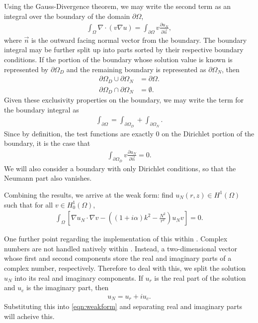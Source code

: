 Using the Gauss-Divergence theorem, we may write the second term as an integral over the boundary of the domain $\partial \Omega$,
\begin{align}
	\int_\Omega \nabla \cdot (v \nabla u ) = \int_{\partial\Omega} v \frac{\partial u_N}{\partial \vec{n}},
\end{align}
where $\vec{n}$ is the outward facing normal vector from the boundary.
The boundary integral may be further split up into parts sorted by their respective boundary conditions.
If the portion of the boundary whose solution value is known is represented by $\partial \Omega_D$ and the remaining boundary is represented as $\partial \Omega_N$, then
\begin{subequations}
\begin{align}
	\partial \Omega_D \cup \partial \Omega_N &= \partial \Omega. \\
	\partial \Omega_D \cap \partial \Omega_N &= \emptyset.
\end{align}
\end{subequations}
Given these exclusivity properties on the boundary, we may write the term for the boundary integral as
\begin{align}
	\int_{\partial\Omega} = \int_{\partial\Omega_D} + \int_{\partial\Omega_N}.
\end{align}
Since by definition, the test functions are exactly 0 on the Dirichlet portion of the boundary, it is the case that
\begin{align}
	\int_{\partial\Omega_D} v \frac{\partial u_N}{\partial \vec{n}} = 0.
\end{align}
We will also consider a boundary with only Dirichlet conditions, so that the Neumann part also vanishes.

Combining the results, we arrive at the weak form: find $u_N(r,z) \in H^1(\Omega)$ such that for all $v \in H^1_0(\Omega)$,
\begin{align}
	\int_\Omega \left[
		\nabla u_N \cdot \nabla v 
	  - \left((1+i\alpha)k^2 - \frac{N^2}{r^2}\right) u_N v 
	\right] = 0. \label{eqn:weakform}
\end{align}


One further point regarding the implementation of this within \oomph.
Complex numbers are not handled natively within \oomph.
Instead, a two-dimensional vector whose first and second components store the real and imaginary parts of a complex number, respectively.
Therefore to deal with this, we split the solution $u_N$ into its real and imaginary components.
If $u_r$ is the real part of the solution and $u_c$ is the imaginary part, then
\begin{align}
	u_N = u_r + i u_c.
\end{align}
Substituting this into \eqref{eqn:weakform} and separating real and imaginary parts will acheive this.








